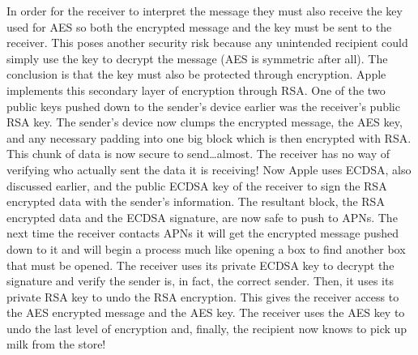     In order for the receiver to interpret the message they must also receive the key used for AES so both the encrypted message and the key must be sent to the receiver.  This poses another security risk because any unintended recipient could simply use the key to decrypt the message (AES is symmetric after all).  The conclusion is that the key must also be protected through encryption.  Apple implements this secondary layer of encryption through RSA.  One of the two public keys pushed down to the sender's device earlier was the receiver's public RSA key.  The sender's device now clumps the encrypted message, the AES key, and any necessary padding into one big block which is then encrypted with RSA.  This chunk of data is now secure to send\ldots almost.  The receiver has no way of verifying who actually sent the data it is receiving!  Now Apple uses ECDSA, also discussed earlier, and the public ECDSA key of the receiver to sign the RSA encrypted data with the sender's information.  The resultant block, the RSA encrypted data and the ECDSA signature, are now safe to push to APNs.  The next time the receiver contacts APNs it will get the encrypted message pushed down to it and will begin a process much like opening a box to find another box that must be opened.  The receiver uses its private ECDSA key to decrypt the signature and verify the sender is, in fact, the correct sender.  Then, it uses its private RSA key to undo the RSA encryption.  This gives the receiver access to the AES encrypted message and the AES key.  The receiver uses the AES key to undo the last level of encryption and, finally, the recipient now knows to pick up milk from the store!
